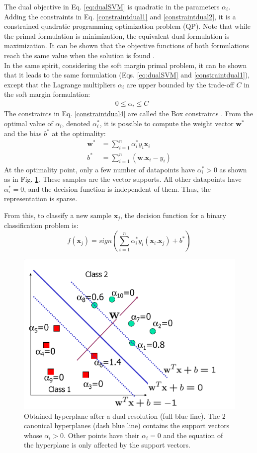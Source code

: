 \noindent The dual objective in Eq. \ref{eq:dualSVM} is quadratic in the parameters $\alpha_i$. Adding the constraints in Eq. \ref{constraintdual1} and \ref{constraintdual2}, it is a constrained quadratic programming optimization problem (QP). Note that while the primal formulation is minimization, the equivalent dual formulation is maximization. It can be shown that the objective functions of both formulations reach the same value when the solution is found \cite{Campbell2011}. \\
In the same spirit, considering the soft margin primal problem, it can be shown that it leads to the same formulation \cite{Campbell2011} (Eqs. \ref{eq:dualSVM} and \ref{constraintdual1}), except that 
the Lagrange multipliers $\alpha_i$ are upper bounded by the trade-off $C$ in the soft margin formulation:
\begin{align}
	& 0 \leq \alpha_i \leq C  \label{constraintdual4}
\end{align}
The constraints in Eq. \ref{constraintdual4} are called the Box constraints \cite{Campbell2011}. From the optimal value of $\alpha_i$, denoted $\alpha_i^*$, it is possible to compute the weight vector $\textbf{w}^*$ and the bias $b^*$ at the optimality:
\begin{align}
	\textbf{w}^* & = \sum\limits_{i=1}^{n}\alpha_i^* y_i \textbf{x}_i \\
	b^* & = \sum\limits_{i=1}^{n} (\textbf{w}.\textbf{x}_i - y_i)
\end{align}
At the optimality point, only a few number of datapoints have $\alpha_i^* > 0$ as shown as in Fig. \ref{fig:SVM_SV}. These samples are the vector supports. All other datapoints have $\alpha_i^*=0$, and the decision function is independent of them. Thus, the representation is sparse. 

\noindent From this, to classify a new sample $\textbf{x}_j$, the decision function for a binary classification problem is:
\begin{equation}
	f(\textbf{x}_j) = sign(\sum\limits_{i=1}^{n} \alpha_i^*y_i(\textbf{x}_i.\textbf{x}_j) + b^*) \label{decisionDual}
\end{equation} 

\begin{figure}[h!]
\centering
\includegraphics[width=0.6\linewidth]{images/SVM_SV}
\caption{Obtained hyperplane after a dual resolution (full blue line). The 2 canonical hyperplanes (dash blue line) contains the support vectors whose $\alpha_i > 0$. Other points have their $\alpha_i = 0$ and the equation of the hyperplane is only affected by the support vectors.}
\label{fig:SVM_SV}
\end{figure}


